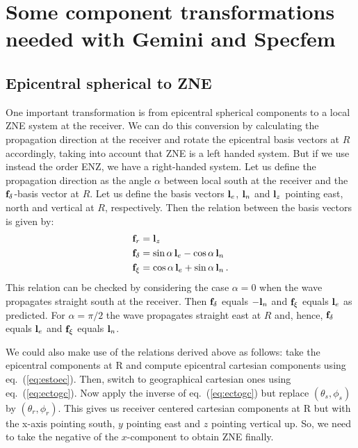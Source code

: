 \documentclass[12pt,a4paper]{article}
\renewcommand{\v}[1]{{\bf #1}}
\begin{document}
%
\section{Some component transformations needed with Gemini and Specfem}
\subsection{Epicentral spherical to ZNE}
One important transformation is from epicentral spherical components to a local ZNE system at the receiver. We can do this conversion by calculating the propagation direction at the receiver and rotate the epicentral basis vectors at $R$ accordingly, taking into account that ZNE is a left handed system. But if we use instead the order ENZ, we have a right-handed system. Let us define the propagation direction as the angle $\alpha$ between local south at the receiver and the $\v{f}_\delta$-basis vector at $R$. Let us define the basis vectors $\v{l}_e$, $\v{l}_n$ and $\v{l}_z$ pointing east, north and vertical at $R$, respectively. Then the relation between the basis vectors is given by:
\begin{align}
\v{f}_r &= \v{l}_z \notag \\
\v{f}_\delta &= \sin\alpha\,\v{l}_e - \cos\alpha\,\v{l}_n \notag \\
\v{f}_\xi &= \cos\alpha\,\v{l}_e + \sin\alpha\,\v{l}_n  \,.
\end{align}
This relation can be checked by considering the case $\alpha=0$ when the wave propagates straight south at the receiver. Then $\v{f}_\delta$ equals $-\v{l}_n$ and $\v{f}_\xi$ equals $\v{l}_e$ as predicted. For $\alpha=\pi/2$ the wave propagates straight east at $R$ and, hence, $\v{f}_\delta$ equals $\v{l}_e$ and $\v{f}_\xi$ equals $\v{l}_n$.

We could also make use of the relations derived above as follows: take the epicentral components at R and compute epicentral cartesian components using eq.~(\ref{eq:estoec}). Then, switch to geographical cartesian ones using eq.~(\ref{eq:ectogc}). Now apply the inverse of eq.~(\ref{eq:ectogc}) but replace $(\theta_s,\phi_s)$ by $(\theta_r,\phi_r)$. This gives us receiver centered cartesian components at R but with the x-axis pointing south, $y$ pointing east and $z$ pointing vertical up. So, we need to take the negative of the $x$-component to obtain ZNE finally.
%
\end{document}
